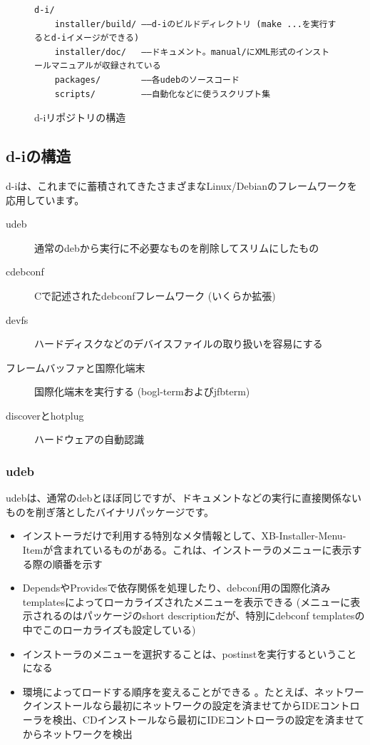 \documentclass[mingoth]{jsarticle}
\begin{document}
\begin{figure}[htbp]
\begin{verbatim}
d-i/
    installer/build/ ――d-iのビルドディレクトリ (make ...を実行するとd-iイメージができる)
    installer/doc/   ――ドキュメント。manual/にXML形式のインストールマニュアルが収録されている
    packages/        ――各udebのソースコード
    scripts/         ――自動化などに使うスクリプト集
\end{verbatim}
  \caption{d-iリポジトリの構造}
  \label{fig:direpo}
\end{figure}

\subsection{d-iの構造}
\label{sec:d-i}

d-iは、これまでに蓄積されてきたさまざまなLinux/Debianのフレームワークを応用しています。

\begin{description}
\item[udeb] 通常のdebから実行に不必要なものを削除してスリムにしたもの
\item[cdebconf] Cで記述されたdebconfフレームワーク (いくらか拡張)
\item[devfs] ハードディスクなどのデバイスファイルの取り扱いを容易にする
\item[フレームバッファと国際化端末] 国際化端末を実行する (bogl-termおよびjfbterm)
\item[discoverとhotplug] ハードウェアの自動認識
\end{description}


\subsubsection{udeb}
\label{sec:udeb}

udebは、通常のdebとほぼ同じですが、ドキュメントなどの実行に直接関係ないものを削ぎ落としたバイナリパッケージです。

\begin{itemize}
\item インストーラだけで利用する特別なメタ情報として、XB-Installer-Menu-Itemが含まれているものがある。これは、インストーラのメニューに表示する際の順番を示す
\item DependsやProvidesで依存関係を処理したり、debconf用の国際化済みtemplatesによってローカライズされたメニューを表示できる (メニューに表示されるのはパッケージのshort descriptionだが、特別にdebconf templatesの中でこのローカライズも設定している)
\item インストーラのメニューを選択することは、postinstを実行するということになる
\item 環境によってロードする順序を変えることができる 。たとえば、ネットワークインストールなら最初にネットワークの設定を済ませてからIDEコントローラを検出、CDインストールなら最初にIDEコントローラの設定を済ませてからネットワークを検出
\end{itemize}
\end{document}
